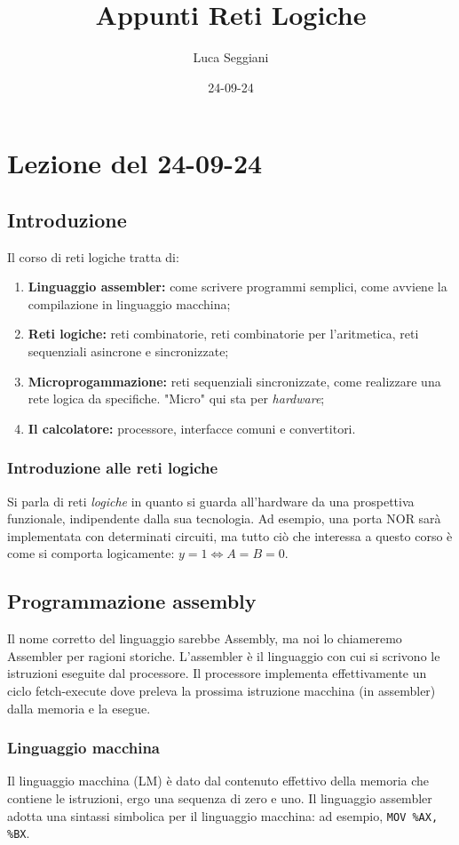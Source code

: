 \documentclass[a4paper,11pt]{article}
\title{Appunti Reti Logiche}
\author{Luca Seggiani}
\date{24-09-24}
\begin{document}
\section{Lezione del 24-09-24}

\thispagestyle{empty}
\pagestyle{fancy}

\subsection{Introduzione}
Il corso di reti logiche tratta di:
\begin{enumerate}
	\item \textbf{Linguaggio assembler:} come scrivere programmi semplici, come avviene la compilazione in linguaggio macchina;
	\item \textbf{Reti logiche:} reti combinatorie, reti combinatorie per l'aritmetica, reti sequenziali asincrone e sincronizzate;
	\item \textbf{Microprogammazione:} reti sequenziali sincronizzate, come realizzare una rete logica da specifiche. 
		"Micro" qui sta per \textit{hardware};
	\item \textbf{Il calcolatore:} processore, interfacce comuni e convertitori.
\end{enumerate}

\subsubsection{Introduzione alle reti logiche}
Si parla di reti \textit{logiche} in quanto si guarda all'hardware da una prospettiva funzionale, indipendente dalla sua tecnologia.
Ad esempio, una porta NOR sarà implementata con determinati circuiti, ma tutto ciò che interessa a questo corso è come si comporta logicamente: $ y = 1 \Leftrightarrow A = B = 0 $.

\subsection{Programmazione assembly}
Il nome corretto del linguaggio sarebbe Assembly, ma noi lo chiameremo Assembler per ragioni storiche.
L'assembler è il linguaggio con cui si scrivono le istruzioni eseguite dal processore.
Il processore implementa effettivamente un ciclo fetch-execute dove preleva la prossima istruzione macchina (in assembler) dalla memoria e la esegue.

\subsubsection{Linguaggio macchina}
Il linguaggio macchina (LM) è dato dal contenuto effettivo della memoria che contiene le istruzioni, ergo una sequenza di zero e uno.
Il linguaggio assembler adotta una sintassi simbolica per il linguaggio macchina: ad esempio, \texttt{MOV \%AX, \%BX}.
\end{document}
